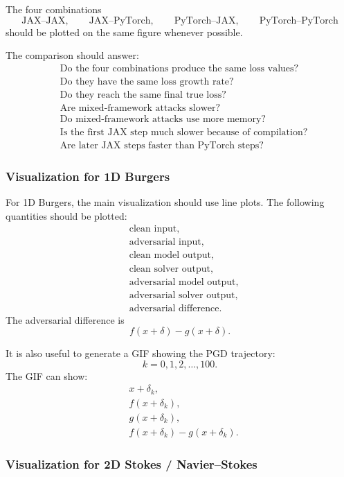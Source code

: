 \documentclass{article}
\begin{document}
The four combinations
\[
\text{JAX--JAX},
\qquad
\text{JAX--PyTorch},
\qquad
\text{PyTorch--JAX},
\qquad
\text{PyTorch--PyTorch}
\]
should be plotted on the same figure whenever possible.

The comparison should answer:
\[
\begin{aligned}
&\text{Do the four combinations produce the same loss values?}\\
&\text{Do they have the same loss growth rate?}\\
&\text{Do they reach the same final true loss?}\\
&\text{Are mixed-framework attacks slower?}\\
&\text{Do mixed-framework attacks use more memory?}\\
&\text{Is the first JAX step much slower because of compilation?}\\
&\text{Are later JAX steps faster than PyTorch steps?}
\end{aligned}
\]

\subsubsection{Visualization for 1D Burgers}

For 1D Burgers, the main visualization should use line plots. The following quantities should be plotted:
\[
\begin{aligned}
&\text{clean input},\\
&\text{adversarial input},\\
&\text{clean model output},\\
&\text{clean solver output},\\
&\text{adversarial model output},\\
&\text{adversarial solver output},\\
&\text{adversarial difference}.
\end{aligned}
\]
The adversarial difference is
\[
f(x+\delta)-g(x+\delta).
\]

It is also useful to generate a GIF showing the PGD trajectory:
\[
k=0,1,2,\dots,100.
\]
The GIF can show:
\[
\begin{aligned}
&x+\delta_k,\\
&f(x+\delta_k),\\
&g(x+\delta_k),\\
&f(x+\delta_k)-g(x+\delta_k).
\end{aligned}
\]

\subsubsection{Visualization for 2D Stokes / Navier--Stokes}
\end{document}

